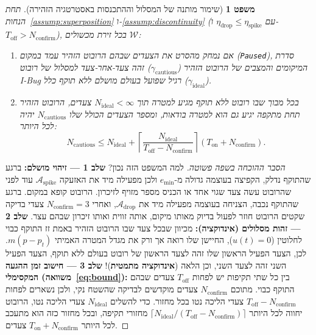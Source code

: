 \documentclass[11pt, a4paper]{article}
\newtheorem{theorem}{משפט}
\begin{document}
\begin{theorem}[שימור מותנה של המסלול וההתכנסות באסטרטגיה הזהירה]
\label{thm:cautious}
תחת הנחות~\ref{assump:superposition} ו-\ref{assump:discontinuity} (עם $\eta_{\text{drop}} \le \eta_{\text{spike}}$ ו-$T_{\text{off}} > N_{\text{confirm}}$), בכל זירת מכשולים $\mathcal{W}$:
\begin{enumerate}
    \item[(א)] אם נמחק מהסרט את הצעדים שבהם הרובוט הזהיר עמד במקום (\foreignlanguage{english}{\texttt{Paused}}), סדרת המיקומים והמצבים של הרובוט הזהיר ($\gamma_{\text{cautious}}$) זהה צעד-אחר-צעד למסלול של רובוט \foreignlanguage{english}{I-Bug} רגיל שפועל בעולם מושלם ללא תוקף כלל ($\gamma_{\text{ideal}}$).
    \item[(ב)] בכל מבוך שבו רובוט ללא תוקף מגיע למטרה תוך $N_{\text{ideal}} < \infty$ צעדים, הרובוט הזהיר תחת מתקפה יגיע גם הוא למטרה בודאות, ומספר הצעדים הכולל שלו $N_{\text{cautious}}$ יהיה לכל היותר:
    \begin{equation}
        N_{\text{cautious}} \le N_{\text{ideal}} + \left\lceil \frac{N_{\text{ideal}}}{T_{\text{off}} - N_{\text{confirm}}} \right\rceil (T_{\text{on}} + N_{\text{confirm}}).
        \label{eq:bound}
    \end{equation}
\end{enumerate}
\end{theorem}

\begin{proof}[הסבר ההוכחה בשפה פשוטה]
למה המשפט הזה נכון?
\textbf{שלב 1 — זיהוי מושלם:} ברגע שהתוקף נדלק, הקפיצה בעוצמה גדולה מ-$e_{\min}$ ולכן מפעילה מיד את האזעקה $\mathcal{A}_{\text{spike}}$ עוד לפני שהרובוט עשה צעד שגוי אחד או הכניס מספר מזויף לזיכרון. הרובוט קופא במקום. ברגע שהתוקף נכבה, הצניחה בעוצמה מפעילה מיד את $\mathcal{A}_{\text{drop}}$, ואחרי $N_{\text{confirm}} = 3$ צעדי בדיקה שקטים הרובוט חוזר לפעול בדיוק מאותו מיקום, אותה זווית ואותו זיכרון שבהם עצר.
\textbf{שלב 2 — זהות מסלולים (אינדוקציה):} מכיוון שבכל צעד שבו הרובוט הזהיר באמת זז התוקף כבוי לחלוטין ($u(t)=0$), החיישן שלו רואה אך ורק את מגדל המטרה האמיתי $m(p - p_t)$. לכן, הצעד הפעיל הראשון שלו זהה לצעד הראשון של רובוט בעולם ללא תוקף, הצעד הפעיל השני זהה לצעד השני, וכן הלאה (\textbf{אינדוקציה מתמטית})!
\textbf{שלב 3 — חישוב זמן ההגעה המקסימלי (משוואה~\eqref{eq:bound}):} בין כל שתי תקיפות יש לפחות $T_{\text{off}}$ צעדים שבהם התוקף כבוי. מתוכם $N_{\text{confirm}}$ צעדים מוקדשים לבדיקה שהשטח נקי, ולכן נשארים לפחות $T_{\text{off}} - N_{\text{confirm}}$ צעדי הליכה נטו בכל מחזור. כדי להשלים $N_{\text{ideal}}$ צעדי הליכה נטו, הרובוט יחווה לכל היותר $\lceil N_{\text{ideal}} / (T_{\text{off}} - N_{\text{confirm}}) \rceil$ מחזורי תקיפה, ובכל מחזור כזה הוא מתעכב לכל היותר $T_{\text{on}} + N_{\text{confirm}}$ צעדים.
\end{proof}
\end{document}
